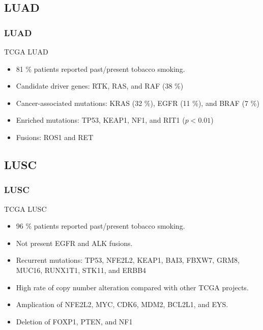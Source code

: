 \documentclass{beamer}
\begin{document}
    \subsection{LUAD}
    \begin{frame}
        \frametitle{LUAD}

        TCGA LUAD \cite{LUAD-1}
        \begin{itemize}
            \item 81 \% patients reported past/present tobacco smoking.
            \item Candidate driver genes: RTK, RAS, and RAF (38 \%)
            \item Cancer-associated mutations: KRAS (32 \%), EGFR (11 \%), and BRAF (7 \%)
            \item Enriched mutations: TP53, KEAP1, NF1, and RIT1 ($p < 0.01$)
            \item Fusions: ROS1 and RET
        \end{itemize}
    \end{frame}

    \subsection{LUSC}
    \begin{frame}
        \frametitle{LUSC}

        TCGA LUSC \cite{LUSC-1}
        \begin{itemize}
            \item 96 \% patients reported past/present tobacco smoking.
            \item Not present EGFR and ALK fusions.
             \item Recurrent mutations: TP53, NFE2L2, KEAP1, BAI3, FBXW7, GRM8, MUC16, RUNX1T1, STK11, and ERBB4
            \item High rate of copy number alteration compared with other TCGA projects.
            \item Amplication of NFE2L2, MYC, CDK6, MDM2, BCL2L1, and EYS.
            \item Deletion of FOXP1, PTEN, and NF1
        \end{itemize}
    \end{frame}
\end{document}
